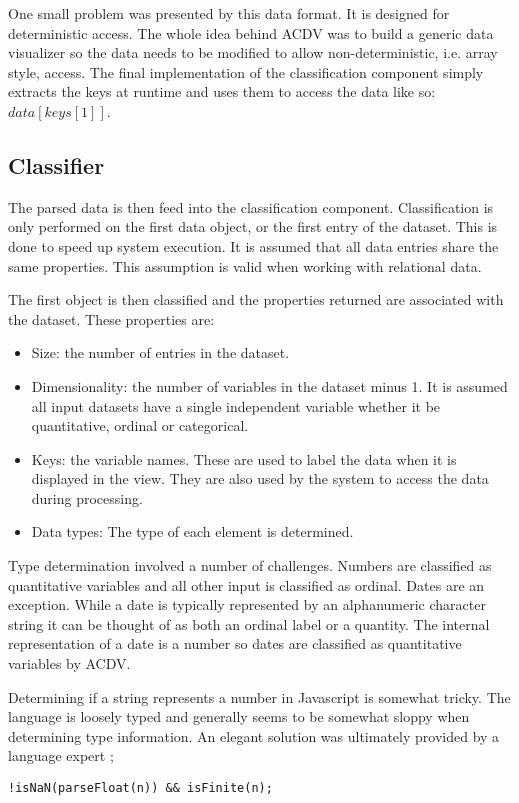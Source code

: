 \documentclass[a4paper, 11pt, titlepage, onehalfspacing]{report}
\begin{document}
One small problem was presented by this data format. It is designed for deterministic access. The whole idea behind AC\lightning{}DV was to build a generic data visualizer so the data needs to be modified to allow non-deterministic, i.e. array style, access. The final implementation of the classification component simply extracts the keys at runtime and uses them to access the data like so: $data[keys[1]]$.  


\subsection{Classifier}
The parsed data is then feed into the classification component. Classification is only performed on the first data object, or the first entry of the dataset. This is done to speed up system execution. It is assumed that all data entries share the same properties. This assumption is valid when working with relational data.

The first object is then classified and the properties returned are associated with the dataset. These properties are:
\begin{itemize}
\item Size: the number of entries in the dataset.
\item Dimensionality: the number of variables in the dataset minus 1. It is assumed all input datasets have a single independent variable whether it be quantitative, ordinal or categorical.
\item Keys: the variable names. These are used to label the data when it is displayed in the view. They are also used by the system to access the data during processing.
\item Data types: The type of each element is determined. 
\end{itemize}

Type determination involved a number of challenges. Numbers are classified as quantitative variables and all other input is classified as ordinal. Dates are an exception. While a date is typically represented by an alphanumeric character string it can be thought of as both an ordinal label or a quantity. The internal representation of a date is a number so dates are classified as quantitative variables by AC\lightning{}DV. 

Determining if a string represents a number in Javascript is somewhat tricky. The language is loosely typed and generally seems to be somewhat sloppy when determining type information. An elegant solution was ultimately provided by a language expert \cite{isnumber}; 
\begin{verbatim}
!isNaN(parseFloat(n)) && isFinite(n);
\end{verbatim}
\end{document}

